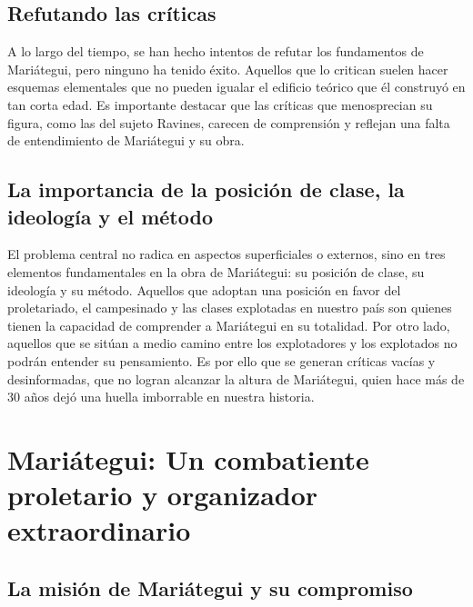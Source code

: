 \documentclass[
  letterpaper,
  DIV=11,
  numbers=noendperiod]{scrartcl}
\begin{document}
\hypertarget{refutando-las-cruxedticas}{%
\subsection{Refutando las críticas}\label{refutando-las-cruxedticas}}

A lo largo del tiempo, se han hecho intentos de refutar los fundamentos
de Mariátegui, pero ninguno ha tenido éxito. Aquellos que lo critican
suelen hacer esquemas elementales que no pueden igualar el edificio
teórico que él construyó en tan corta edad. Es importante destacar que
las críticas que menosprecian su figura, como las del sujeto Ravines,
carecen de comprensión y reflejan una falta de entendimiento de
Mariátegui y su obra.

\hypertarget{la-importancia-de-la-posiciuxf3n-de-clase-la-ideologuxeda-y-el-muxe9todo}{%
\subsection{La importancia de la posición de clase, la ideología y el
método}\label{la-importancia-de-la-posiciuxf3n-de-clase-la-ideologuxeda-y-el-muxe9todo}}

El problema central no radica en aspectos superficiales o externos, sino
en tres elementos fundamentales en la obra de Mariátegui: su posición de
clase, su ideología y su método. Aquellos que adoptan una posición en
favor del proletariado, el campesinado y las clases explotadas en
nuestro país son quienes tienen la capacidad de comprender a Mariátegui
en su totalidad. Por otro lado, aquellos que se sitúan a medio camino
entre los explotadores y los explotados no podrán entender su
pensamiento. Es por ello que se generan críticas vacías y desinformadas,
que no logran alcanzar la altura de Mariátegui, quien hace más de 30
años dejó una huella imborrable en nuestra historia.

\hypertarget{mariuxe1tegui-un-combatiente-proletario-y-organizador-extraordinario}{%
\section{Mariátegui: Un combatiente proletario y organizador
extraordinario}\label{mariuxe1tegui-un-combatiente-proletario-y-organizador-extraordinario}}

\hypertarget{la-misiuxf3n-de-mariuxe1tegui-y-su-compromiso}{%
\subsection{La misión de Mariátegui y su
compromiso}\label{la-misiuxf3n-de-mariuxe1tegui-y-su-compromiso}}
\end{document}
